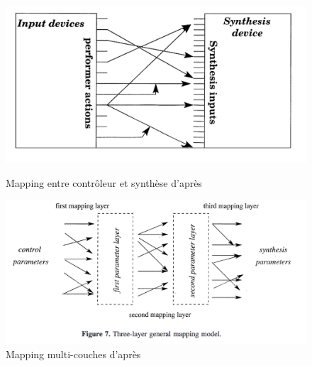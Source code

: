 
\begin{figure}[!htbp]
	\captionsetup{format=plain}%
	\centering
	\begin{minipage}[t]{0.48\textwidth}
		\includegraphics[width=\linewidth]{gfx/04_algorithms/Wanderley_Schema1.png}
		\caption[Représentation du mapping \#1]{Mapping entre contrôleur et synthèse d'après \cite{hunt_towards_2000}}
		\label{fig:algorithms:DynamicMappingLayer1}
	\end{minipage}
	\hspace{.02\linewidth}
	\begin{minipage}[t]{0.48\textwidth}
	  \includegraphics[width=\linewidth]{gfx/04_algorithms/Wanderley_Schema2.png}
		\caption[Représentation du mapping \#2]{Mapping multi-couches d'après \cite{hunt_mapping_2002}}
		\label{fig:algorithms:DynamicMappingLayer2}
	\end{minipage}
\end{figure}

